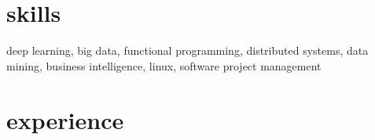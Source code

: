 \documentclass[]{friggeri-cv}
\begin{document}
\section{skills}

deep learning,
big data,
functional programming,
distributed systems,
data mining,
business intelligence,
linux,
software project management

\section{experience}
\end{document}
